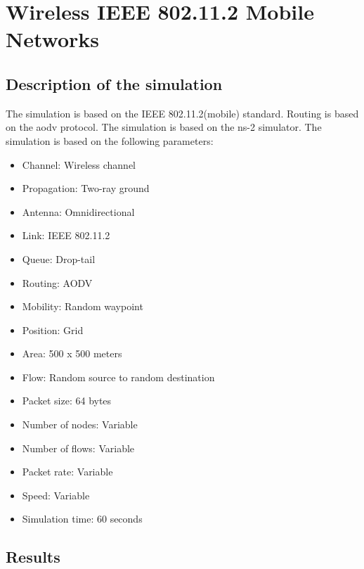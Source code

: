 \section{Wireless IEEE 802.11.2 Mobile Networks}
\subsection{Description of the simulation}
The simulation is based on the IEEE 802.11.2(mobile) standard. Routing is based on the aodv protocol. The simulation is based on the ns-2 simulator. The simulation is based on the following parameters:
\begin{itemize}
    \item Channel: Wireless channel
    \item Propagation: Two-ray ground
    \item Antenna: Omnidirectional
    \item Link: IEEE 802.11.2
    \item Queue: Drop-tail
    \item Routing: AODV
    \item Mobility: Random waypoint
    \item Position: Grid
    \item Area: 500 x 500 meters
    \item Flow: Random source to random destination
    \item Packet size: 64 bytes
    \item Number of nodes: Variable
    \item Number of flows: Variable
    \item Packet rate: Variable
    \item Speed: Variable
    \item Simulation time: 60 seconds
\end{itemize}

\subsection{Results}
